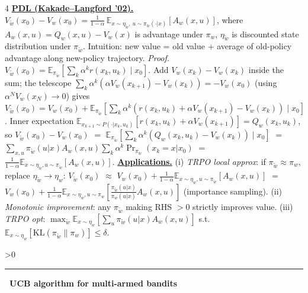 \documentclass[10pt,landscape,letterpaper]{article}
\let\oldtextbf\textbf
\renewcommand{\textbf}[1]{\uline{\oldtextbf{#1}}}
\renewcommand{\section}[1]{%
  \ifnum\value{section}>0\par\vspace{1pt}\hrule\vspace{1pt}\fi
  \refstepcounter{section}\oldtextbf{\thesection\ #1}\ }
\begin{document}
\begin{multicols*}{4}
\textbf{PDL (Kakade–Langford '02).}
\(V_{\tilde w}(x_0)-V_w(x_0)=\tfrac{1}{1-\alpha}\,\mathbb E_{x\sim\eta_{\tilde w},\,u\sim\pi_{\tilde w}(\cdot|x)}[A_w(x,u)]\),
where \(A_w(x,u)=Q_w(x,u)-V_w(x)\) is advantage under \(\pi_w\), \(\eta_{\tilde w}\) is discounted state distribution under \(\pi_{\tilde w}\).
Intuition: new value = old value + average of old-policy advantage along new-policy trajectory.
\emph{Proof.} \(V_{\tilde w}(x_0)=\mathbb E_{\pi_{\tilde w}}\!\left[\sum_k\alpha^k r(x_k,u_k)\!\mid\!x_0\right]\). Add \(V_w(x_k)-V_w(x_k)\) inside the sum; the telescope \(\sum_k\alpha^k(\alpha V_w(x_{k+1})-V_w(x_k))=-V_w(x_0)\) (using \(\alpha^N V_w(x_N)\!\to\!0\)) gives \(V_{\tilde w}(x_0)=V_w(x_0)+\mathbb E_{\pi_{\tilde w}}\!\left[\sum_k\alpha^k(r(x_k,u_k)+\alpha V_w(x_{k+1})-V_w(x_k))\!\mid\!x_0\right]\).
Inner expectation \(\mathbb E_{x_{k+1}\sim P(\cdot|x_k,u_k)}[r(x_k,u_k)+\alpha V_w(x_{k+1})]=Q_w(x_k,u_k)\), so \(V_{\tilde w}(x_0)-V_w(x_0)\) \(=\) \(\mathbb E_{\pi_{\tilde w}}[\sum_k\alpha^k(Q_w(x_k,u_k)-V_w(x_k))\!\mid\!x_0]\) \(=\) \(\sum_{x,u}\pi_{\tilde w}(u|x)A_w(x,u)\sum_k\alpha^k\Pr_{\pi_{\tilde w}}(x_k{=}x|x_0)\) \(=\) \(\tfrac{1}{1-\alpha}\mathbb E_{x\sim\eta_{\tilde w},u\sim\pi_{\tilde w}}[A_w(x,u)]\).
\textbf{Applications.}
(i) \emph{TRPO local approx}: if \(\pi_{\tilde w}\!\approx\!\pi_w\), replace \(\eta_{\tilde w}\!\to\!\eta_w\): \(V_{\tilde w}(x_0)\) \(\approx\) \(V_w(x_0)+\tfrac{1}{1-\alpha}\mathbb E_{x\sim\eta_w,u\sim\pi_{\tilde w}}[A_w(x,u)]\) \(=\) \(V_w(x_0)+\tfrac{1}{1-\alpha}\mathbb E_{x\sim\eta_w,u\sim\pi_w}[\tfrac{\pi_{\tilde w}(u|x)}{\pi_w(u|x)}A_w(x,u)]\) (importance sampling).
(ii) \emph{Monotonic improvement}: any \(\pi_{\tilde w}\) making RHS \(>0\) strictly improves value.
(iii) \emph{TRPO opt}: \(\max_{\tilde w}\mathbb E_{x\sim\eta_w}[\sum_u\pi_{\tilde w}(u|x)A_w(x,u)]\) s.t.\ \(\mathbb E_{x\sim\eta_w}[\mathrm{KL}(\pi_{\tilde w}\|\pi_w)]\le\delta\).

\section{UCB algorithm for multi-armed bandits}


\end{multicols*}
\end{document}

